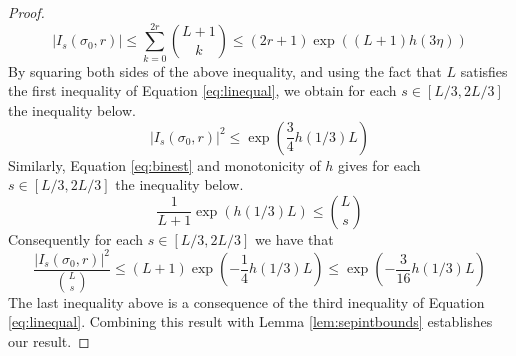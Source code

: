 \documentclass[10pt,a4paper]{amsart}
\begin{document}
\begin{proof}
\begin{equation*}
|I_{s}(\sigma_{0},r)| \leq \sum_{k=0}^{2r} \binom{L+1}{k} \leq (2r+1)\exp\left((L+1)h(3\eta)\right)
\end{equation*}
By squaring both sides of the above inequality, and using the fact that $L$ satisfies the first inequality of Equation \ref{eq:linequal}, we obtain for each $s \in [L/3,2L/3]$ the inequality below.
\begin{equation}\label{eq:numbound}
|I_{s}(\sigma_{0},r)|^{2} \leq \exp\left(\frac{3}{4}h(1/3)L\right)
\end{equation}
Similarly, Equation \ref{eq:binest} and monotonicity of $h$ gives for each $s \in [L/3,2L/3]$ the inequality below.
\begin{equation}\label{eq:denbound}
\frac{1}{L+1}\exp\left(h(1/3)L\right) \leq \binom{L}{s}  
\end{equation}
Consequently for each $s \in [L/3,2L/3]$ we have that
\begin{equation*}
 \frac{|I_{s}(\sigma_{0},r)|^{2}}{\binom{L}{s}} \leq \left(L+1\right)\exp\left(-\frac{1}{4}h(1/3)L\right) \leq \exp\left(-\frac{3}{16}h(1/3)L\right)
\end{equation*}
The last inequality above is a consequence of the third inequality of Equation \ref{eq:linequal}.  Combining this result with Lemma \ref{lem:sepintbounds} establishes our result.
\end{proof}
\end{document}
